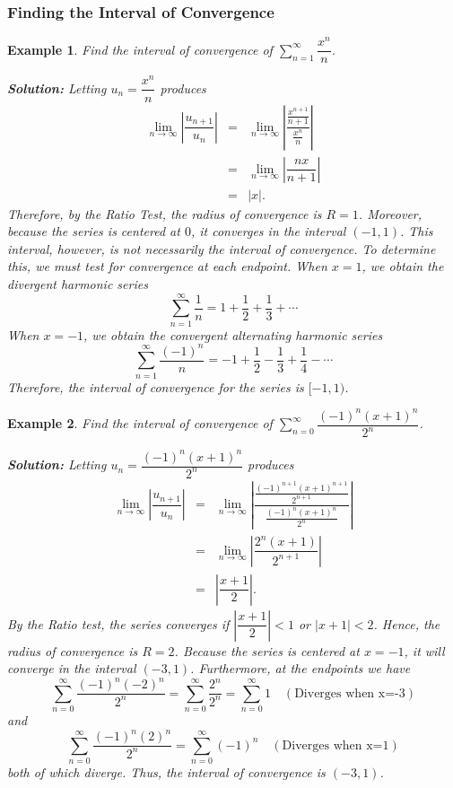 \documentclass[titlepage,a4paper,12pt]{report}
\newtheorem{example}{Example}[section]
\begin{document}
\subsubsection{Finding the Interval of Convergence}
\begin{example}
Find the interval of convergence of $\displaystyle \sum _{n=1}^\infty \dfrac{x^n}{n}$.

\noindent \textbf{Solution:} Letting $u_n=\dfrac{x^n}{n}$ produces 
\begin{eqnarray*}
\lim _{n\rightarrow \infty} \left|\dfrac{u_{n+1}}{u_n}\right| &=& \lim _{n\rightarrow \infty}\left|\dfrac{\frac{x^{n+1}}{n+1}}{\frac{x^n}{n}}\right|\\
&=& \lim _{n\rightarrow \infty} \left|\dfrac{nx}{n+1}\right|\\
&=& |x|.
\end{eqnarray*}
Therefore, by the Ratio Test, the radius of convergence is $R=1$. Moreover, because the series is centered at $0$, it converges in the interval $(-1,1)$. This interval, however, is not necessarily the interval of convergence. To determine this, we must test for convergence at each endpoint. When $x=1$, we obtain the divergent harmonic series 
\[\sum _{n=1}^\infty \dfrac{ 1}{n}=1+\dfrac{1}{2}+\dfrac{1}{3}+\cdots\] When $x=-1$, we obtain the convergent alternating harmonic series \[\sum _{n=1}^\infty \dfrac{(-1)^n}{n}=-1+\dfrac{1}{2}-\dfrac{1}{3}+\dfrac{1}{4}-\cdots\] Therefore, the interval of convergence for the series is $[-1,1)$.
\end{example}
\begin{example}
Find the interval of convergence of $\displaystyle \sum _{n=0}^\infty \dfrac{(-1)^n(x+1)^n}{2^n}$.

\noindent \textbf{Solution:} Letting $u_n=\dfrac{(-1)^n(x+1)^n}{2^n}$ produces 
\begin{eqnarray*}
\lim _{n\rightarrow \infty} \left|\dfrac{u_{n+1}}{u_n}\right| &=& \lim _{n\rightarrow \infty}\left|\dfrac{\frac{(-1)^{n+1}(x+1)^{n+1}}{2^{n+1}}}{\frac{(-1)^n(x+1)^n}{2^n}}\right|\\
&=& \lim _{n\rightarrow \infty} \left|\dfrac{2^n(x+1)}{2^{n+1}}\right|\\
&=& \left|\dfrac{x+1}{2}\right|.
\end{eqnarray*}
By the Ratio test, the series converges if $\left|\dfrac{x+1}{2}\right| <1$ or $|x+1|<2$. Hence, the radius of convergence is $R=2$. Because the series is centered at $x=-1$, it will converge in the interval $(-3,1)$. Furthermore, at the endpoints we have 
\[\sum _{n=0}^\infty \dfrac{(-1)^n(-2)^n}{2^n}=\sum _{n=0}^\infty \dfrac{2^n}{2^n}=\sum _{n=0}^\infty 1 \quad (\mbox{Diverges when x=-3})\] and \[\sum _{n=0}^\infty \dfrac{(-1)^n(2)^n}{2^n}=\sum _{n=0}^\infty (-1)^n \quad (\mbox{Diverges when  x=1})\]
both of which diverge. Thus, the interval of convergence is $(-3,1)$.
\end{example}
\end{document}
